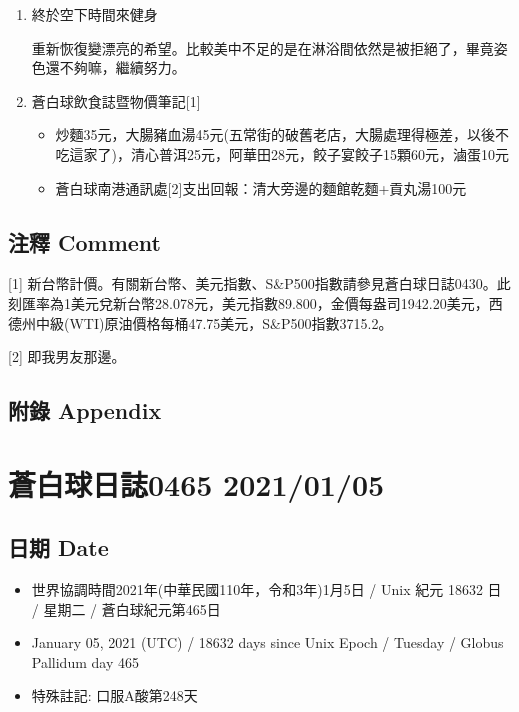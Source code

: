\documentclass[a5paper, 10pt
]{book}
\providecommand{\tightlist}{%
  \setlength{\itemsep}{0pt}\setlength{\parskip}{0pt}}
\begin{document}
\begin{enumerate}
\def\labelenumi{\arabic{enumi}.}
\item
  終於空下時間來健身

  重新恢復變漂亮的希望。比較美中不足的是在淋浴間依然是被拒絕了，畢竟姿色還不夠嘛，繼續努力。
\item
  蒼白球飲食誌暨物價筆記{[}1{]}

  \begin{itemize}
  \tightlist
  \item
    炒麵35元，大腸豬血湯45元(五常街的破舊老店，大腸處理得極差，以後不吃這家了)，清心普洱25元，阿華田28元，餃子宴餃子15顆60元，滷蛋10元
  \item
    蒼白球南港通訊處{[}2{]}支出回報：清大旁邊的麵館乾麵+貢丸湯100元
  \end{itemize}
\end{enumerate}

\hypertarget{ux6ce8ux91cb-comment-34}{%
\subsection{注釋 Comment}\label{ux6ce8ux91cb-comment-34}}

{[}1{]}
新台幣計價。有關新台幣、美元指數、S\&P500指數請參見蒼白球日誌0430。此刻匯率為1美元兌新台幣28.078元，美元指數89.800，金價每盎司1942.20美元，西德州中級(WTI)原油價格每桶47.75美元，S\&P500指數3715.2。

{[}2{]} 即我男友那邊。

\hypertarget{ux9644ux9304-appendix-34}{%
\subsection{附錄 Appendix}\label{ux9644ux9304-appendix-34}}

\hypertarget{ux84bcux767dux7403ux65e5ux8a8c0465-20210105}{%
\section{蒼白球日誌0465
2021/01/05}\label{ux84bcux767dux7403ux65e5ux8a8c0465-20210105}}

\hypertarget{ux65e5ux671f-date-35}{%
\subsection{日期 Date}\label{ux65e5ux671f-date-35}}

\begin{itemize}
\tightlist
\item
  世界協調時間2021年(中華民國110年，令和3年)1月5日 / Unix 紀元 18632 日
  / 星期二 / 蒼白球紀元第465日
\item
  January 05, 2021 (UTC) / 18632 days since Unix Epoch / Tuesday /
  Globus Pallidum day 465
\item
  特殊註記: 口服A酸第248天
\end{itemize}
\end{document}
